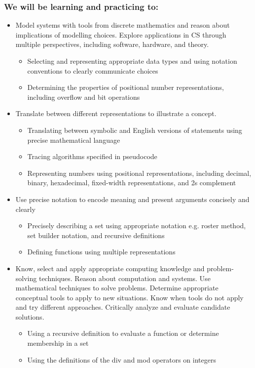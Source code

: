 \subsubsection*{We will be learning and practicing to:}
\begin{itemize}
\item Model systems with tools from discrete mathematics and reason about implications of modelling choices. Explore applications in CS through multiple perspectives, including software, hardware, and theory.
\begin{itemize}
   \item Selecting and representing appropriate data types and using notation conventions to clearly communicate choices
   \item Determining the properties of positional number representations, including overflow and bit operations
\end{itemize}

\item Translate between different representations to illustrate a concept.

\begin{itemize}
   \item Translating between symbolic and English versions of statements using precise mathematical language
   \item Tracing algorithms specified in pseudocode
   \item Representing numbers using positional representations, including decimal, binary, hexadecimal, fixed-width representations, and 2s complement
\end{itemize}


\item Use precise notation to encode meaning and present arguments concisely and clearly
\begin{itemize}
    \item Precisely describing a set using appropriate notation e.g. roster method, set builder notation, and recursive definitions
    \item Defining functions using multiple representations
\end{itemize}

\item Know, select and apply appropriate computing knowledge and problem-solving techniques. Reason about computation and systems. Use mathematical techniques to solve problems. Determine appropriate conceptual tools to apply to new situations. Know when tools do not apply and try different approaches. Critically analyze and evaluate candidate solutions.
\begin{itemize}
    \item Using a recursive definition to evaluate a function or determine membership in a set
    \item Using the definitions of the div and mod operators on integers
\end{itemize}

\end{itemize}

